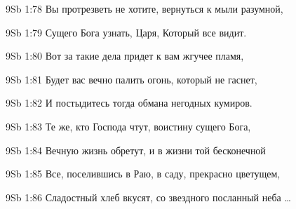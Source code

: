 \vs 9Sb 1:78 Вы протрезветь не хотите, вернуться к мыли разумной,

\vs 9Sb 1:79 Сущего Бога узнать, Царя, Который все видит.

\vs 9Sb 1:80 Вот за такие дела придет к вам жгучее пламя,

\vs 9Sb 1:81 Будет вас вечно палить огонь, который не гаснет,

\vs 9Sb 1:82 И постыдитесь тогда обмана негодных кумиров.

\vs 9Sb 1:83 Те же, кто Господа чтут, воистину сущего Бога,

\vs 9Sb 1:84 Вечную жизнь обретут, и в жизни той бесконечной

\vs 9Sb 1:85 Все, поселившись в Раю, в саду, прекрасно цветущем,

\vs 9Sb 1:86 Сладостный хлеб вкусят, со звездного посланный неба \ldots

